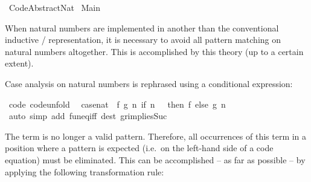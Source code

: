 %
\begin{isabellebody}%
%
%
\isamarkuptrue%
%
\isadelimtheory
%
\endisadelimtheory
%
\isatagtheory
{}\isamarkupfalse%
\ Code{\isacharunderscore}Abstract{\isacharunderscore}Nat\isanewline
{}\ Main\isanewline
{}%
\endisatagtheory
{\isafoldtheory}%
%
\isadelimtheory
%
\endisadelimtheory
%
\begin{isamarkuptext}%
When natural numbers are implemented in another than the
  conventional inductive / representation,
  it is necessary to avoid all pattern matching on natural numbers
  altogether.  This is accomplished by this theory (up to a certain
  extent).%
\end{isamarkuptext}\isamarkuptrue%
%
\isamarkuptrue%
%
\begin{isamarkuptext}%
Case analysis on natural numbers is rephrased using a conditional
  expression:%
\end{isamarkuptext}\isamarkuptrue%
\isamarkupfalse%
\ {\isacharbrackleft}code{\isacharcomma}\ code{\isacharunderscore}unfold{\isacharbrackright}{\isacharcolon}\isanewline
\ \ {\isachardoublequoteopen}case{\isacharunderscore}nat\ {\isacharequal}\ {\isacharparenleft}{\isasymlambda}f\ g\ n{\isachardot}\ if\ n\ {\isacharequal}\ {}\ then\ f\ else\ g\ {\isacharparenleft}n\ {\isacharminus}\ {}{\isacharparenright}{\isacharparenright}{\isachardoublequoteclose}\isanewline
%
\isadelimproof
\ \ %
\endisadelimproof
%
\isatagproof
{}\isamarkupfalse%
\ {\isacharparenleft}auto\ simp\ add{\isacharcolon}\ fun{\isacharunderscore}eq{\isacharunderscore}iff\ dest{\isacharbang}{\isacharcolon}\ gr{}{\isacharunderscore}implies{\isacharunderscore}Suc{\isacharparenright}%
\endisatagproof
{\isafoldproof}%
%
\isadelimproof
%
\endisadelimproof
%
\isamarkuptrue%
%
\begin{isamarkuptext}%
The term  is no longer a valid pattern.  Therefore,
  all occurrences of this term in a position where a pattern is
  expected (i.e.~on the left-hand side of a code equation) must be
  eliminated.  This can be accomplished -- as far as possible -- by
  applying the following transformation rule:%
\end{isamarkuptext}\isamarkuptrue%
\isamarkupfalse%

\end{isabellebody}
